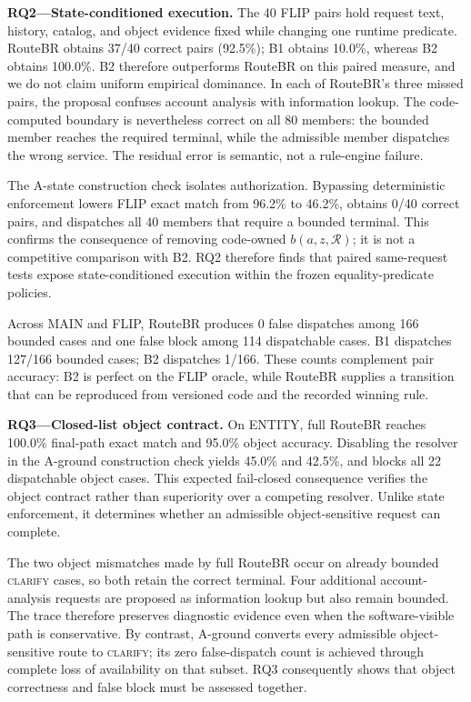 \documentclass[10pt,conference,a4paper]{IEEEtran}
\newcommand{\method}{RouteBR}
\begin{document}
\noindent\textbf{RQ2---State-conditioned execution.}
The 40 FLIP pairs hold request text, history, catalog, and object evidence fixed while changing one runtime predicate. \method{} obtains 37/40 correct pairs (92.5\%); B1 obtains 10.0\%, whereas B2 obtains 100.0\%. B2 therefore outperforms \method{} on this paired measure, and we do not claim uniform empirical dominance. In each of \method{}'s three missed pairs, the proposal confuses account analysis with information lookup. The code-computed boundary is nevertheless correct on all 80 members: the bounded member reaches the required terminal, while the admissible member dispatches the wrong service. The residual error is semantic, not a rule-engine failure.

The A-state construction check isolates authorization. Bypassing deterministic enforcement lowers FLIP exact match from 96.2\% to 46.2\%, obtains 0/40 correct pairs, and dispatches all 40 members that require a bounded terminal. This confirms the consequence of removing code-owned $b(a,z,\mathcal{R})$; it is not a competitive comparison with B2. RQ2 therefore finds that paired same-request tests expose state-conditioned execution within the frozen equality-predicate policies.

Across MAIN and FLIP, \method{} produces 0 false dispatches among 166 bounded cases and one false block among 114 dispatchable cases. B1 dispatches 127/166 bounded cases; B2 dispatches 1/166. These counts complement pair accuracy: B2 is perfect on the FLIP oracle, while \method{} supplies a transition that can be reproduced from versioned code and the recorded winning rule.

\noindent\textbf{RQ3---Closed-list object contract.}
On ENTITY, full \method{} reaches 100.0\% final-path exact match and 95.0\% object accuracy. Disabling the resolver in the A-ground construction check yields 45.0\% and 42.5\%, and blocks all 22 dispatchable object cases. This expected fail-closed consequence verifies the object contract rather than superiority over a competing resolver. Unlike state enforcement, it determines whether an admissible object-sensitive request can complete.

The two object mismatches made by full \method{} occur on already bounded \textsc{clarify} cases, so both retain the correct terminal. Four additional account-analysis requests are proposed as information lookup but also remain bounded. The trace therefore preserves diagnostic evidence even when the software-visible path is conservative. By contrast, A-ground converts every admissible object-sensitive route to \textsc{clarify}; its zero false-dispatch count is achieved through complete loss of availability on that subset. RQ3 consequently shows that object correctness and false block must be assessed together.
\end{document}
